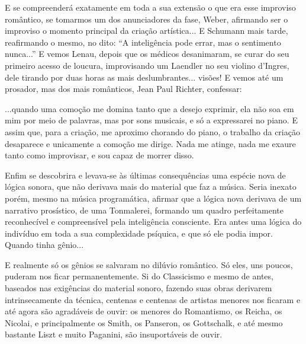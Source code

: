 E se compreenderá exatamente em toda a sua extensão o que era esse
improviso romântico, se tomarmos um dos anunciadores da fase, Weber,
afirmando ser o improviso o momento principal da criação artística... E
Schumann mais tarde, reafirmando o mesmo, no dito: ``A inteligência pode
errar, mas o sentimento nunca...'' E vemos Lenau, depois que os médicos
desanimaram, se curar do seu primeiro acesso de loucura, improvisando um
Laendler no seu violino d'Ingres, dele tirando por duas horas as mais
deslumbrantes... visões! E vemos até um prosador, mas dos mais
românticos, Jean Paul Richter, confessar:

...quando uma comoção me domina tanto que a desejo exprimir, ela não soa
em mim por meio de palavras, mas por sons musicais, e só a expressarei
no piano. E assim que, para a criação, me aproximo chorando do piano, o
trabalho da criação desaparece e unicamente a comoção me dirige. Nada me
atinge, nada me exaure tanto como improvisar, e sou capaz de morrer
disso.

Enfim se descobrira e levava-se às últimas consequências uma espécie
nova de lógica sonora, que não derivava mais do material que faz a
música. Seria inexato porém, mesmo na música programática, afirmar que a
lógica nova derivava de um narrativo prosístico, de uma Tonmalerei,
formando um quadro perfeitamente reconhecível e compreensível pela
inteligência consciente. Era antes uma lógica do indivíduo em toda a sua
complexidade psíquica, e que só ele podia impor. Quando tinha gênio...

E realmente só os gênios se salvaram no dilúvio romântico. Só eles, uns
poucos, puderam nos ficar permanentemente. Si do Classicismo e mesmo de
antes, baseados nas exigências do material sonoro, fazendo suas obras
derivarem intrinsecamente da técnica, centenas e centenas de artistas
menores nos ficaram e até agora são agradáveis de ouvir: os menores do
Romantismo, os Reicha, os Nicolai, e principalmente os Smith, os
Panseron, os Gottschalk, e até mesmo bastante Liszt e muito Paganini,
são insuportáveis de ouvir.

